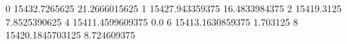 0 15432.7265625 21.2666015625
1 15427.943359375 16.4833984375
2 15419.3125 7.8525390625
4 15411.4599609375 0.0
6 15413.1630859375 1.703125
8 15420.1845703125 8.724609375
